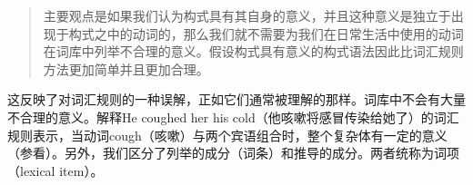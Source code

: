 \begin{quote}
主要观点是如果我们认为构式具有其自身的意义，并且这种意义是独立于出现于构式之中的动词的，那么我们就不需要为我们在日常生活中使用的动词在词库中列举不合理的意义。假设构式具有意义的构式语法因此比词汇规则方法更加简单并且更加合理。\citep[]{Tomasello2003a}
\end{quote}

\noindent
这反映了对词汇规则的一种误解，正如它们通常被理解的那样。词库中不会有大量不合理的意义。解释He coughed her his cold（他咳嗽将感冒传染给她了）的词汇规则表示，当动词cough（咳嗽）与两个宾语组合时，整个复杂体有一定的意义（参看\citealp[]{Mueller2006d}）。另外，我们区分了列举的成分（词条）和推导的成分。两者统称为词项（lexical item）。

